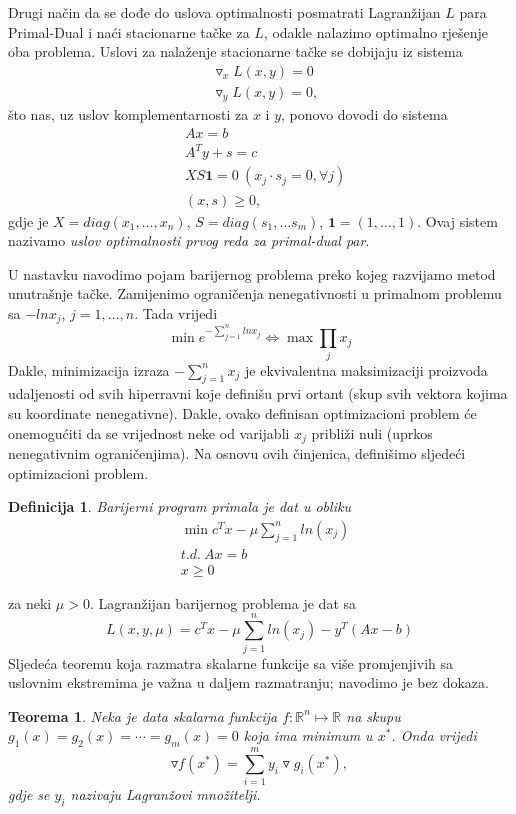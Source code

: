 \documentclass[a4paper, utf8, 11pt, colorlinks]{book}
\newtheorem{definition}{Definicija}[chapter]
\newtheorem{thm}{Teorema}[chapter]
\theoremstyle{definition}
\begin{document}
Drugi način da se dođe do uslova optimalnosti posmatrati Lagranžijan $L$ para Primal-Dual i naći stacionarne tačke za $L$, odakle nalazimo optimalno rješenje oba problema.  Uslovi za nalaženje stacionarne tačke se dobijaju iz sistema
\begin{align}
	&\triangledown_x L(x,y) = 0\\
	&\triangledown_y L(x,y) = 0,
\end{align} 
što nas, uz uslov komplementarnosti za $x$ i $y$, ponovo dovodi do sistema
\begin{align}
	&Ax = b \\
	&A^T y + s = c \\
	&XS\mathbf{1} = 0 \ (x_j \cdot s_j =0 , \forall j) \\
	&  (x, s ) \geq 0,
\end{align}
gdje je $X = diag (x_1, \ldots, x_n)$, $S= diag(s_1,\ldots s_m)$, $\mathbf{1}=(1,\ldots, 1)$. Ovaj sistem nazivamo \emph{uslov optimalnosti prvog reda za primal-dual par}. 

U nastavku navodimo pojam barijernog problema preko kojeg razvijamo metod unutrašnje tačke. Zamijenimo ograničenja nenegativnosti u primalnom problemu sa $-ln x_j$, $j=1,\ldots,n$.   
Tada vrijedi 
$$\min e^{-\sum_{j=1}^n ln x_j} \Leftrightarrow \max \prod_{j} x_j $$
Dakle, minimizacija izraza $-\sum_{j=1}^n x_j$ je ekvivalentna maksimizaciji proizvoda udaljenosti od svih hiperravni koje definišu prvi ortant (skup svih vektora kojima su koordinate nenegativne). Dakle, ovako definisan optimizacioni problem će onemogućiti da se vrijednost neke od varijabli $x_j$ približi nuli (uprkos nenegativnim ograničenjima).  Na osnovu ovih činjenica, definišimo sljedeći optimizacioni problem. 

\begin{definition}
	Barijerni program  primala je dat u obliku 
	\begin{align*}
		&\min c^T x - \mu \sum_{j=1}^n ln(x_j) \\
		&{t.d. \ } A x = b \\
		& x \geq 0
	\end{align*}
\end{definition}
za neki $\mu >0$. Lagranžijan barijernog problema je dat sa 
$$  L(x, y, \mu) = c^T x - \mu \sum_{j=1}^n ln(x_j)  - y^T(Ax - b) $$
Sljedeća teoremu koja razmatra skalarne funkcije sa više promjenjivih sa uslovnim ekstremima je važna u daljem razmatranju; navodimo  je bez dokaza. 
\begin{thm}
	Neka je data skalarna funkcija  $f:\mathbb{R}^n \mapsto \mathbb{R}$ na skupu $g_1(x)=g_2(x)= \cdots = g_m(x) =0$ koja ima minimum u $x^*$. Onda vrijedi 
	$$ \triangledown f (x^*) = \sum_{i=1}^m y_i \triangledown g_i(x^*),$$
	gdje se $y_i$ nazivaju Lagranžovi množitelji. 
\end{thm}
\end{document}
